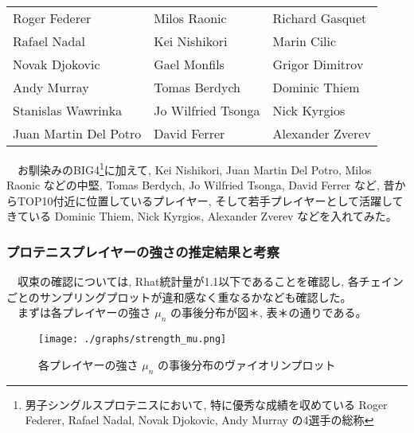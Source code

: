 \documentclass[uplatex,9pt,a5j]{jsarticle}
\begin{document}
\begin{table}[htb]
  \begin{tabular}{lll}
    Roger Federer & Milos Raonic & Richard Gasquet \\
    Rafael Nadal & Kei Nishikori & Marin Cilic \\
    Novak Djokovic & Gael Monfils & Grigor Dimitrov \\
    Andy Murray & Tomas Berdych & Dominic Thiem \\
    Stanislas Wawrinka & Jo Wilfried Tsonga & Nick Kyrgios \\
    Juan Martin Del Potro & David Ferrer & Alexander Zverev \\
  \end{tabular}
\end{table}
　お馴染みのBIG4\footnote{男子シングルスプロテニスにおいて, 特に優秀な成績を収めている Roger Federer, Rafael Nadal, Novak Djokovic, Andy Murray の4選手の総称}に加えて, Kei Nishikori, Juan Martin Del Potro, Milos Raonic などの中堅, Tomas Berdych, Jo Wilfried Tsonga, David Ferrer など, 昔からTOP10付近に位置しているプレイヤー, そして若手プレイヤーとして活躍してきている Dominic Thiem, Nick Kyrgios, Alexander Zverev などを入れてみた。\\

\subsubsection{プロテニスプレイヤーの強さの推定結果と考察}
　収束の確認については, Rhat統計量が1.1以下であることを確認し, 各チェインごとのサンプリングプロットが違和感なく重なるかなども確認した。\\
　まずは各プレイヤーの強さ $\mu_n$ の事後分布が図＊,  表＊の通りである。\\
\begin{figure}[htbp]
  \begin{center}
    \texttt{[image: ./graphs/strength\_mu.png]}
    \caption{各プレイヤーの強さ $\mu_n$ の事後分布のヴァイオリンプロット}
    \label{fig:fig_strength_mu}
  \end{center}
\end{figure}
\end{document}
